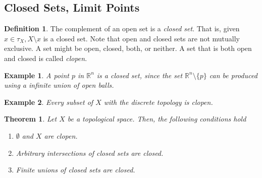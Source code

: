 \documentclass{article}
\newtheorem{theorem}{Theorem}[section]
\newtheorem{example}{Example}[section]
\theoremstyle{remark}
\theoremstyle{definition}
\newtheorem{definition}{Definition}[section]
\begin{document}
\subsection{Closed Sets, Limit Points}
\begin{definition}
The complement of an open set is a \textit{closed set}. That is, given $x \in \tau_{X}, X \setminus x$ is a closed set. Note that open and closed sets are not mutually exclusive. A set might be open, closed, both, or neither. A set that is both open and closed is called \textit{clopen}.
\end{definition}

\begin{example}
A point $p$ in $\mathbb{R}^{n}$ is a closed set, since the set $\mathbb{R}^{n} \setminus \{p\}$ can be produced using a infinite union of open balls. 
\end{example}

\begin{example}
Every subset of $X$ with the discrete topology is clopen.
\end{example}

\begin{theorem}
Let $X$ be a topological space. Then, the following conditions hold
\begin{enumerate}
    \item $\emptyset$ and $X$ are clopen.
    \item Arbitrary intersections of closed sets are closed. 
    \item Finite unions of closed sets are closed. 
\end{enumerate}
\end{theorem}
\end{document}
